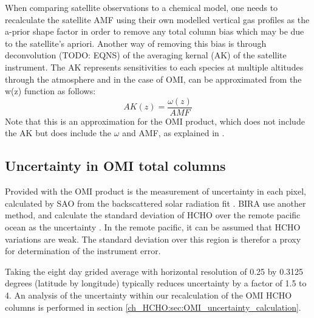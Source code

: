     When comparing satellite observations to a chemical model, one needs to recalculate the satellite AMF using their own modelled vertical gas profiles as the a-prior shape factor in order to remove any total column bias which may be due to the satellite's apriori.
    Another way of removing this bias is through deconvolution (TODO: EQNS) of the averaging kernal (AK) of the satellite instrument.
    The AK represents sensitivities to each species at multiple altitudes through the atmosphere and in the case of OMI, can be approximated from the w(z) function as follows:
    \begin{equation} \label{ch_HCHO:eqn:AKfromw}
      AK(z) = \frac{\omega(z)}{AMF}
    \end{equation}
    Note that this is an approximation for the OMI product, which does not include the AK but does include the $\omega$ and AMF, as explained in \citet{Abad2015}.
    
  \subsection{Uncertainty in OMI total columns}
  \label{ch_HCHO:sec:OMIuncertainty}
    Provided with the OMI product is the measurement of uncertainty in each pixel, calculated by SAO from the backscattered solar radiation fit \citep{Abad2015,Abad2016}.
    BIRA use another method, and calculate the standard deviation of HCHO over the remote pacific ocean as the uncertainty 
    \citep{DeSmedt2012, DeSmedt2015}.
    In the remote pacific, it can be assumed that HCHO variations are weak.
    The standard deviation over this region is therefor a proxy for determination of the instrument error.
    
    Taking the eight day grided average with horizontal resolution of 0.25 by 0.3125 degrees (latitude by longitude) typically reduces uncertainty by a factor of 1.5 to 4.
    An analysis of the uncertainty within our recalculation of the OMI HCHO columns is performed in section \ref{ch_HCHO:sec:OMI_uncertainty_calculation}.
      
